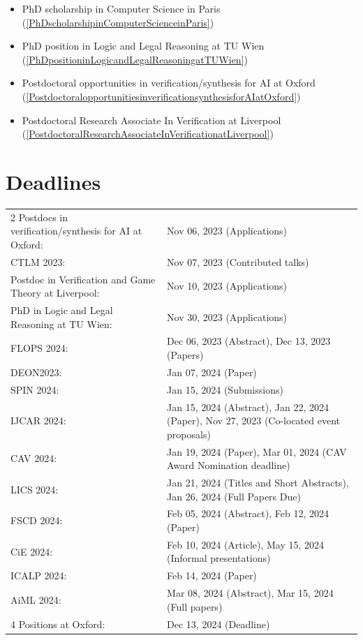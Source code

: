 \documentclass[prodmode,acmtecs]{acmsmall} %
\begin{document}
\begin{itemize}
\begin{itemize}\item PhD scholarship in Computer Science in Paris (\cref{PhDscholarshipinComputerScienceinParis})
\item PhD position in Logic and Legal Reasoning at TU Wien (\cref{PhDpositioninLogicandLegalReasoningatTUWien})
\item Postdoctoral opportunities in verification/synthesis for AI at Oxford (\cref{PostdoctoralopportunitiesinverificationsynthesisforAIatOxford})
\item Postdoctoral Research Associate In Verification at Liverpool (\cref{PostdoctoralResearchAssociateInVerificationatLiverpool})
\end{itemize} 
\end{itemize}\section{Deadlines}\label{deadlines}\begin{tabulary}{\linewidth}{LL}2 Postdocs in verification/synthesis for AI at Oxford:  & Nov 06, 2023 (Applications) \\
CTLM 2023:  & Nov 07, 2023 (Contributed talks) \\
Postdoc in Verification and Game Theory at Liverpool:  & Nov 10, 2023 (Applications) \\
PhD in Logic and Legal Reasoning at TU Wien:  & Nov 30, 2023 (Applications) \\
FLOPS 2024:  & Dec 06, 2023 (Abstract), Dec 13, 2023 (Papers) \\
DEON2023:  & Jan 07, 2024 (Paper) \\
SPIN 2024:  & Jan 15, 2024 (Submissions) \\
IJCAR 2024:  & Jan 15, 2024 (Abstract), Jan 22, 2024 (Paper), Nov 27, 2023 (Co-located event proposals) \\
CAV 2024:  & Jan 19, 2024 (Paper), Mar 01, 2024 (CAV Award Nomination deadline) \\
LICS 2024:  & Jan 21, 2024 (Titles and Short Abstracts), Jan 26, 2024 (Full Papers Due) \\
FSCD 2024:  & Feb 05, 2024 (Abstract), Feb 12, 2024 (Paper) \\
CiE 2024:  & Feb 10, 2024 (Article), May 15, 2024 (Informal presentations) \\
ICALP 2024:  & Feb 14, 2024 (Paper) \\
AiML 2024:  & Mar 08, 2024 (Abstract), Mar 15, 2024 (Full papers) \\
4 Positions at Oxford:  & Dec 13, 2024 (Deadline) \\
\end{tabulary}
\end{document}
